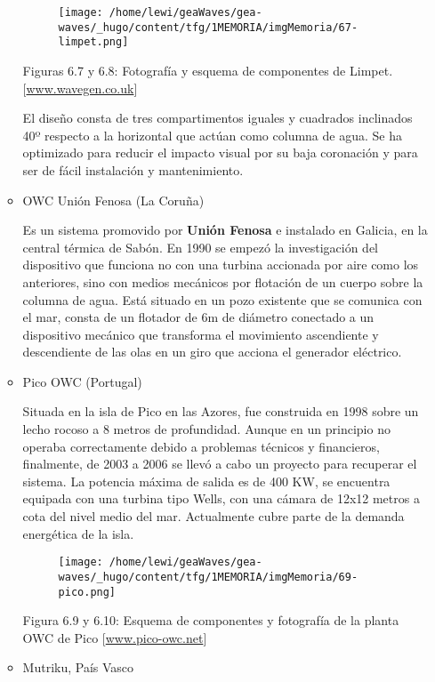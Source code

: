 \documentclass[]{article}
\begin{document}
\begin{itemize}
\begin{itemize}
    \begin{figure}
    \centering
    \texttt{[image: /home/lewi/geaWaves/gea-waves/\_hugo/content/tfg/1MEMORIA/imgMemoria/67-limpet.png]}
    \caption{}
    \end{figure}

    Figuras 6.7 y 6.8: Fotografía y esquema de componentes de Limpet.
    {[}\url{www.wavegen.co.uk}{]}

    El diseño consta de tres compartimentos iguales y cuadrados
    inclinados 40º respecto a la horizontal que actúan como columna de
    agua. Se ha optimizado para reducir el impacto visual por su baja
    coronación y para ser de fácil instalación y mantenimiento.
  \item
    OWC Unión Fenosa (La Coruña)

    Es un sistema promovido por \textbf{Unión Fenosa} e instalado en
    Galicia, en la central térmica de Sabón. En 1990 se empezó la
    investigación del dispositivo que funciona no con una turbina
    accionada por aire como los anteriores, sino con medios mecánicos
    por flotación de un cuerpo sobre la columna de agua. Está situado en
    un pozo existente que se comunica con el mar, consta de un flotador
    de 6m de diámetro conectado a un dispositivo mecánico que transforma
    el movimiento ascendiente y descendiente de las olas en un giro que
    acciona el generador eléctrico. 
  \item
    Pico OWC (Portugal)

    Situada en la isla de Pico en las Azores, fue construida en 1998
    sobre un lecho rocoso a 8 metros de profundidad. Aunque en un
    principio no operaba correctamente debido a problemas técnicos y
    financieros, finalmente, de 2003 a 2006 se llevó a cabo un proyecto
    para recuperar el sistema. La potencia máxima de salida es de 400
    KW, se encuentra equipada con una turbina tipo Wells, con una cámara
    de 12x12 metros a cota del nivel medio del mar. Actualmente cubre
    parte de la demanda energética de la isla.

    \begin{figure}
    \centering
    \texttt{[image: /home/lewi/geaWaves/gea-waves/\_hugo/content/tfg/1MEMORIA/imgMemoria/69-pico.png]}
    \caption{}
    \end{figure}

    Figura 6.9 y 6.10: Esquema de componentes y fotografía de la planta
    OWC de Pico {[}\url{www.pico-owc.net}{]} 
  \item
    Mutriku, País Vasco


\end{itemize}
\end{itemize}
\end{document}

